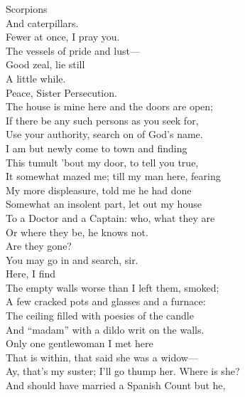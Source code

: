 \documentclass[a4paper,oneside,12pt]{memoir}
\begin{document}
\begin{drama*}
\persecutionspeaks {} Scorpions\\
And caterpillars.\\
\lovewitspeaks {} Fewer at once, I pray you.\\
\persecutionspeaks The vessels of pride and lust---\\
\lovewitspeaks {} Good zeal, lie still\\
A little while.\\
\tribulationspeaks {} Peace, Sister Persecution.\\
\lovewitspeaks The house is mine here and the doors are open;\\
If there be any such persons as you seek for,\\
Use your authority, search on of God's name.\\
I am but newly come to town and finding\\
This tumult 'bout my door, to tell you true,\\
It somewhat mazed me; till my man here, fearing\\
My more displeasure, told me he had done\\
Somewhat an insolent part, let out my house\\
To a Doctor and a Captain: who, what they are\\
Or where they be, he knows not.\\
\mammonspeaks {} Are they gone?\\
\lovewitspeaks You may go in and search, sir.\\
 Here, I find\\
The empty walls worse than I left them, smoked;\\
A few cracked pots and glasses and a furnace:\\
The ceiling filled with poesies of the candle\\
And ``madam'' with a dildo writ on the walls.\\
Only one gentlewoman I met here\\
That is within, that said she was a widow---\\
\kastrilspeaks Ay, that's my suster; I'll go thump her. Where is she?\\
\lovewitspeaks And should have married a Spanish Count but he,\\

\end{drama*}
\end{document}
